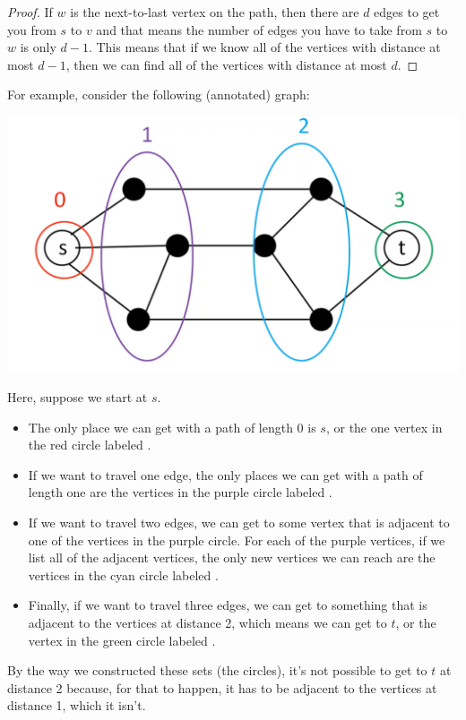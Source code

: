 \documentclass[letterpaper]{article}
\begin{document}
\begin{mdframed}[]
    \begin{proof}
        If $w$ is the next-to-last vertex on the path, then there are $d$ edges to get you from $s$ to $v$ and that means the number of edges you have to take from $s$ to $w$ is only $d - 1$. This means that if we know all of the vertices with distance at most $d - 1$, then we can find all of the vertices with distance at most $d$.
    \end{proof}
\end{mdframed}

For example, consider the following (annotated) graph:
\begin{center}
    \includegraphics[scale=0.4]{assets/1_2_3_dist.png}
\end{center}
Here, suppose we start at $s$.
\begin{itemize}
    \item The only place we can get with a path of length 0 is $s$, or the one vertex in the red circle labeled .
    \item If we want to travel one edge, the only places we can get with a path of length one are the vertices in the purple circle labeled .
    \item If we want to travel two edges, we can get to some vertex that is adjacent to one of the vertices in the purple circle. For each of the purple vertices, if we list all of the adjacent vertices, the only new vertices we can reach are the vertices in the cyan circle labeled .
    \item Finally, if we want to travel three edges, we can get to something that is adjacent to the vertices at distance 2, which means we can get to $t$, or the vertex in the green circle labeled . 
\end{itemize}
By the way we constructed these sets (the circles), it's not possible to get to $t$ at distance 2 because, for that to happen, it has to be adjacent to the vertices at distance 1, which it isn't.
\end{document}
